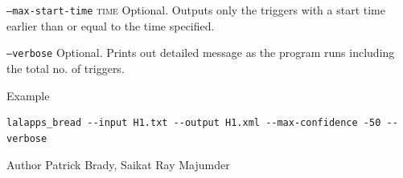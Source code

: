\begin{entry}
\begin{entry}
\item[\texttt{--max-start-time} \textsc{time}]
Optional. Outputs only the triggers with a start time earlier than or equal to the time specified.

\item[\texttt{--verbose}]
Optional. Prints out detailed message as the program runs including the total no. of triggers.

\end{entry}

\item[Example]
\begin{verbatim}
lalapps_bread --input H1.txt --output H1.xml --max-confidence -50 --verbose
\end{verbatim}

\item[Author] 
Patrick Brady, Saikat Ray Majumder
\end{entry}
